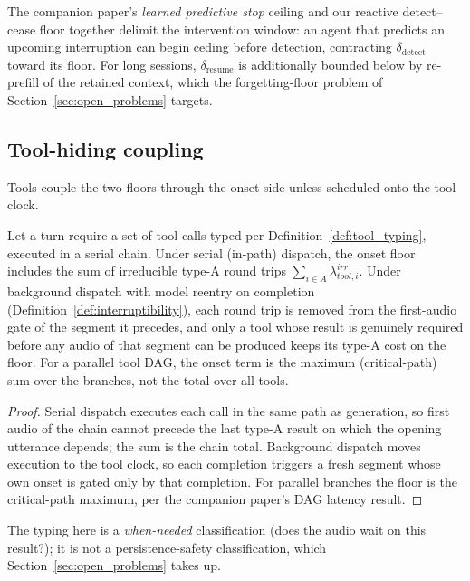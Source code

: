 \begin{remark}
The companion paper's \emph{learned predictive stop} ceiling and our reactive detect--cease
floor together delimit the intervention window: an agent that predicts an upcoming
interruption can begin ceding before detection, contracting $\delta_{\mathrm{detect}}$ toward
its floor.
For long sessions, $\delta_{\mathrm{resume}}$ is additionally bounded below by re-prefill of
the retained context, which the forgetting-floor problem of
Section~\ref{sec:open_problems} targets.
\end{remark}

\subsection{Tool-hiding coupling}
Tools couple the two floors through the onset side unless scheduled onto the tool clock.

\begin{theorem}
\label{thm:tool_hiding}
Let a turn require a set of tool calls typed per Definition~\ref{def:tool_typing}, executed
in a serial chain.
Under serial (in-path) dispatch, the onset floor includes the sum of irreducible type-A round
trips $\sum_{i \in A} \lambda_{tool,i}^{irr}$.
Under background dispatch with model reentry on completion
(Definition~\ref{def:interruptibility}), each round trip is removed from the first-audio gate
of the segment it precedes, and only a tool whose result is genuinely required before any
audio of that segment can be produced keeps its type-A cost on the floor.
For a parallel tool DAG, the onset term is the maximum (critical-path) sum over the branches,
not the total over all tools.
\end{theorem}

\begin{proof}
Serial dispatch executes each call in the same path as generation, so first audio of the
chain cannot precede the last type-A result on which the opening utterance depends; the sum
is the chain total.
Background dispatch moves execution to the tool clock, so each completion triggers a fresh
segment whose own onset is gated only by that completion.
For parallel branches the floor is the critical-path maximum, per the companion
paper's DAG latency result.
\end{proof}

The typing here is a \emph{when-needed} classification (does the audio wait on this
result?); it is not a persistence-safety classification, which
Section~\ref{sec:open_problems} takes up.

